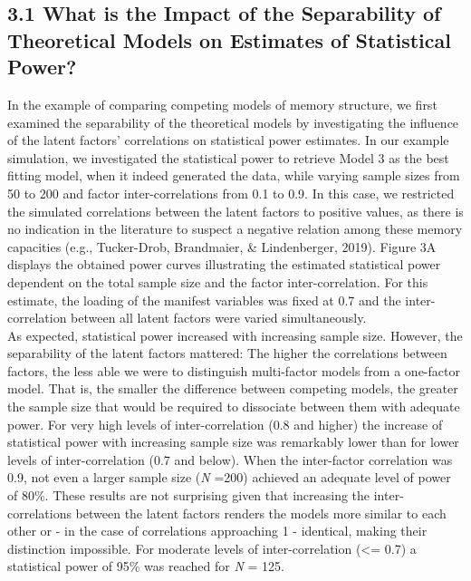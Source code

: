 \documentclass[
  man,floatsintext]{apa6}
\begin{document}
\hypertarget{what-is-the-impact-of-the-separability-of-theoretical-models-on-estimates-of-statistical-power}{%
\subsection{3.1 What is the Impact of the Separability of Theoretical Models on Estimates of Statistical Power?}\label{what-is-the-impact-of-the-separability-of-theoretical-models-on-estimates-of-statistical-power}}

In the example of comparing competing models of memory structure, we first examined the separability of the theoretical models by investigating the influence of the latent factors' correlations on statistical power estimates. In our example simulation, we investigated the statistical power to retrieve Model 3 as the best fitting model, when it indeed generated the data, while varying sample sizes from 50 to 200 and factor inter-correlations from 0.1 to 0.9. In this case, we restricted the simulated correlations between the latent factors to positive values, as there is no indication in the literature to suspect a negative relation among these memory capacities (e.g., Tucker-Drob, Brandmaier, \& Lindenberger, 2019). Figure 3A displays the obtained power curves illustrating the estimated statistical power dependent on the total sample size and the factor inter-correlation. For this estimate, the loading of the manifest variables was fixed at 0.7 and the inter-correlation between all latent factors were varied simultaneously.\\
As expected, statistical power increased with increasing sample size. However, the separability of the latent factors mattered: The higher the correlations between factors, the less able we were to distinguish multi-factor models from a one-factor model. That is, the smaller the difference between competing models, the greater the sample size that would be required to dissociate between them with adequate power. For very high levels of inter-correlation (0.8 and higher) the increase of statistical power with increasing sample size was remarkably lower than for lower levels of inter-correlation (0.7 and below). When the inter-factor correlation was 0.9, not even a larger sample size (\emph{N} =200) achieved an adequate level of power of 80\%. These results are not surprising given that increasing the inter-correlations between the latent factors renders the models more similar to each other or - in the case of correlations approaching 1 - identical, making their distinction impossible. For moderate levels of inter-correlation (\textless= 0.7) a statistical power of 95\% was reached for \emph{N} = 125.
\end{document}
